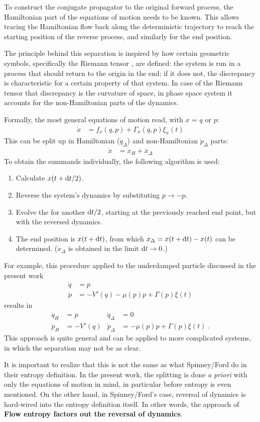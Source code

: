 To construct the conjugate propagator to the original forward process, the Hamiltonian part of the equations of motion needs to be known. This allows tracing the Hamiltonian flow back along the deterministic trajectory to reach the starting position of the reverse process, and similarly for the end position.

The principle behind this separation is inspired by how certain geometric symbols, specifically the Riemann tensor , are defined: the system is run in a process that should return to the origin in the end; if it does not, the discrepancy is characteristic for a certain property of that system. In case of the Riemann tensor that discrepancy is the curvature of space, in phase space system it accounts for the non-Hamiltonian parts of the dynamics.

Formally, the most general equations of motion read, with \(x\) = \(q\) or \(p\):
%
\begin{align}
	\dot x &= f_x(q,p) + \Gamma_x(q,p)\xi_x(t)
\end{align}
%
This can be split up in Hamiltonian (\(\dot q_\Delta\)) and non-Hamiltonian \(\dot p_\Delta\) parts:
%
\begin{align}
	\dot x &= \dot x_H + \dot x_\Delta
\end{align}
%
To obtain the summands individually, the following algorithm is used:
%
\begin{enumerate}
	\item Calculate \(x(t+\mathrm{d} t/2) \).
	\item Reverse the system's dynamics by substituting \(p \to -p\).
	\item Evolve the for another \(\mathrm{d} t/2\), starting at the previously reached end point, but with the reversed dynamics.
	\item The end position is \(x(t+\mathrm{d} t)\), from which \(x_\Delta = x(t+\mathrm{d} t) - x(t)\) can be determined. (\(\dot x_\Delta\) is obtained in the limit \(\mathrm{d} t \to 0\).)
\end{enumerate}
%
For example, this procedure applied to the underdamped particle discussed in the present work
%
\begin{align*}
	\dot q &= p \\
	\dot p &= -V'(q) - \mu(p)p + \Gamma(p)\xi(t)
\end{align*}
results in
\begin{align*}
	\dot q_H &= p  &  \dot q_\Delta &= 0 \\
	\dot p_H &= -V'(q)  &  \dot p_\Delta &= - \mu(p)p + \Gamma(p)\xi(t) ~.
\end{align*}
This approach is quite general and can be applied to more complicated systems, in which the separation may not be as clear.

It is important to realize that this is not the same as what Spinney/Ford do in their entropy definition. In the present work, the splitting is done \emph{a priori} with only the equations of motion in mind, in particular before entropy is even mentioned. On the other hand, in Spinney/Ford's case, reversal of dynamics is hard-wired into the entropy definition itself. In other words, the approach of \textbf{Flow entropy factors out the reversal of dynamics}.

